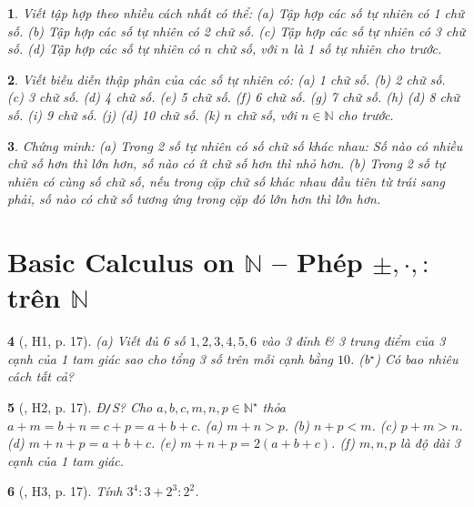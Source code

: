 \documentclass{article}
\newtheorem{baitoan}{}
\begin{document}
\begin{baitoan}
	Viết tập hợp theo nhiều cách nhất có thể: (a) Tập hợp các số tự nhiên có 1 chữ số. (b) Tập hợp các số tự nhiên có 2 chữ số. (c) Tập hợp các số tự nhiên có 3 chữ số. (d) Tập hợp các số tự nhiên có $n$ chữ số, với $n$ là 1 số tự nhiên cho trước.
\end{baitoan}

\begin{baitoan}
	Viết biễu diễn thập phân của các số tự nhiên có: (a) 1 chữ số. (b) 2 chữ số. (c) 3 chữ số. (d) 4 chữ số. (e) 5 chữ số. (f) 6 chữ số. (g) 7 chữ số. (h) (d) 8 chữ số. (i) 9 chữ số. (j) (d) 10 chữ số. (k) $n$ chữ số, với $n\in\mathbb{N}$ cho trước. 
\end{baitoan}

\begin{baitoan}
	Chứng minh: (a) Trong 2 số tự nhiên có số chữ số khác nhau: Số nào có nhiều chữ số hơn thì lớn hơn, số nào có ít chữ số hơn thì nhỏ hơn. (b) Trong 2 số tự nhiên có cùng số chữ số, nếu trong cặp chữ số khác nhau đầu tiên từ trái sang phải, số nào có chữ số tương ứng trong cặp đó lớn hơn thì lớn hơn.
\end{baitoan}


\section{Basic Calculus on $\mathbb{N}$ -- Phép $\pm,\cdot,:$ trên $\mathbb{N}$}

\begin{baitoan}[\cite{Binh_boi_duong_Toan_6_tap_1}, H1, p. 17]
	(a) Viết đủ 6 số $1,2,3,4,5,6$ vào 3 đỉnh \& 3 trung điểm của 3 cạnh của 1 tam giác sao cho tổng 3 số trên mỗi cạnh bằng $10$. (b${}^\star$) Có bao nhiêu cách tất cả?
\end{baitoan}

\begin{baitoan}[\cite{Binh_boi_duong_Toan_6_tap_1}, H2, p. 17]
	{\rm Đ{\tt/}S?} Cho $a,b,c,m,n,p\in\mathbb{N}^\star$ thỏa $a + m = b + n = c + p = a + b + c$. (a) $m + n > p$. (b) $n + p < m$. (c) $p + m > n$. (d) $m + n + p = a + b + c$. (e) $m + n + p = 2(a + b + c)$. (f) $m,n,p$ là độ dài 3 cạnh của 1 tam giác.
\end{baitoan}

\begin{baitoan}[\cite{Binh_boi_duong_Toan_6_tap_1}, H3, p. 17]
	Tính $3^4:3 + 2^3:2^2$.
\end{baitoan}
\end{document}
